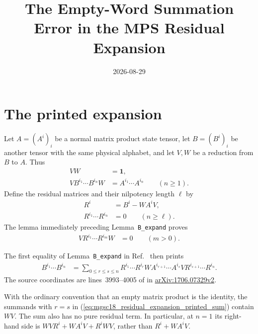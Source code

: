 \documentclass{article}
\title{The Empty-Word Summation Error in the MPS Residual Expansion}
\author{}
\date{2026-08-29}
\begin{document}
\maketitle
{}

\section{The printed expansion}

Let $A=(A^i)_i$ be a normal matrix product state tensor, let
$B=(B^i)_i$ be another tensor with the same physical alphabet, and let
$V,W$ be a reduction from $B$ to $A$.  Thus
\begin{align}
    VW
        &=\mathbf 1,
    \label{eq:mgsc18_residual_expansion_retraction}\\
    VB^{i_1}\cdots B^{i_n}W
        &=A^{i_1}\cdots A^{i_n}
        \qquad (n\geq1).
    \label{eq:mgsc18_residual_expansion_reduction_words}
\end{align}
Define the residual matrices and their nilpotency length $\ell$ by
\begin{align}
    R^i
        &=B^i-WA^iV,
    \label{eq:mgsc18_residual_expansion_residual_definition}\\
    R^{i_1}\cdots R^{i_n}
        &=0
        \qquad (n\geq\ell).
    \label{eq:mgsc18_residual_expansion_nilpotency}
\end{align}
The lemma immediately preceding Lemma~\texttt{B\_expand} proves
\begin{align}
    VR^{i_1}\cdots R^{i_m}W
        &=0
        \qquad (m>0).
    \label{eq:mgsc18_residual_expansion_sandwiched_word}
\end{align}

The first equality of Lemma~\texttt{B\_expand} in
Ref.~\cite{Molnar2018SemiInjective} then prints
\begin{align}
    B^{i_1}\cdots B^{i_n}
        &=\sum_{0\leq r\leq s\leq n}
          R^{i_1}\cdots R^{i_r}
          W A^{i_{r+1}}\cdots A^{i_s}V
          R^{i_{s+1}}\cdots R^{i_n}.
    \label{eq:mgsc18_residual_expansion_printed_sum}
\end{align}
The source coordinates are lines~3993--4005 of  in
\href{https://arxiv.org/abs/1706.07329v2}{arXiv:1706.07329v2}.

With the ordinary convention that an empty matrix product is the identity,
the summands with $r=s$ in
(\ref{eq:mgsc18_residual_expansion_printed_sum}) contain $WV$.  The sum also
has no pure residual term.  In particular, at $n=1$ its right-hand side is
$WVR^i+WA^iV+R^iWV$, rather than $R^i+WA^iV$.
\end{document}
